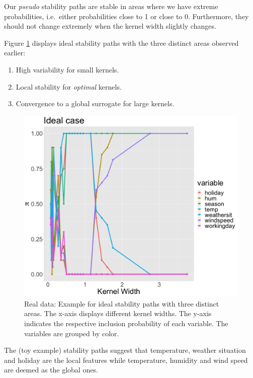 \documentclass[]{krantz}
\begin{document}
Our \emph{pseudo} stability paths are stable in areas where we have
extreme probabilities, i.e.~either probabilities close to 1 or close to
0. Furthermore, they should not change extremely when the kernel width
slightly changes.

Figure \ref{fig:lime-fig131} displays ideal stability paths with the
three distinct areas observed earlier:

\begin{enumerate}
\def\labelenumi{\arabic{enumi}.}
\item
  High variability for small kernels.
\item
  Local stability for \emph{optimal} kernels.
\item
  Convergence to a global surrogate for large kernels.
\end{enumerate}

\begin{figure}

{\centering \includegraphics[width=0.99\linewidth]{images/04-09-14} 

}

\caption{Real data: Example for ideal stability paths with three distinct areas. The x-axis displays different kernel widths. The y-axis indicates the respective inclusion probability of each variable. The variables are grouped by color.}\label{fig:lime-fig131}
\end{figure}

The (toy example) stability paths suggest that temperature, weather
situation and holiday are the local features while temperature, humidity
and wind speed are deemed as the global ones.
\end{document}
